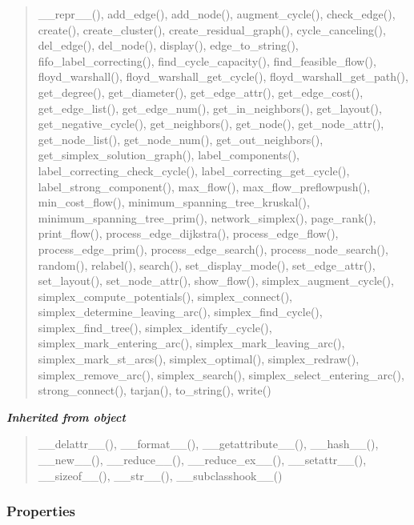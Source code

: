 \begin{quote}
\_\_repr\_\_(), add\_edge(), add\_node(), augment\_cycle(), check\_edge(), create(), create\_cluster(), create\_residual\_graph(), cycle\_canceling(), del\_edge(), del\_node(), display(), edge\_to\_string(), fifo\_label\_correcting(), find\_cycle\_capacity(), find\_feasible\_flow(), floyd\_warshall(), floyd\_warshall\_get\_cycle(), floyd\_warshall\_get\_path(), get\_degree(), get\_diameter(), get\_edge\_attr(), get\_edge\_cost(), get\_edge\_list(), get\_edge\_num(), get\_in\_neighbors(), get\_layout(), get\_negative\_cycle(), get\_neighbors(), get\_node(), get\_node\_attr(), get\_node\_list(), get\_node\_num(), get\_out\_neighbors(), get\_simplex\_solution\_graph(), label\_components(), label\_correcting\_check\_cycle(), label\_correcting\_get\_cycle(), label\_strong\_component(), max\_flow(), max\_flow\_preflowpush(), min\_cost\_flow(), minimum\_spanning\_tree\_kruskal(), minimum\_spanning\_tree\_prim(), network\_simplex(), page\_rank(), print\_flow(), process\_edge\_dijkstra(), process\_edge\_flow(), process\_edge\_prim(), process\_edge\_search(), process\_node\_search(), random(), relabel(), search(), set\_display\_mode(), set\_edge\_attr(), set\_layout(), set\_node\_attr(), show\_flow(), simplex\_augment\_cycle(), simplex\_compute\_potentials(), simplex\_connect(), simplex\_determine\_leaving\_arc(), simplex\_find\_cycle(), simplex\_find\_tree(), simplex\_identify\_cycle(), simplex\_mark\_entering\_arc(), simplex\_mark\_leaving\_arc(), simplex\_mark\_st\_arcs(), simplex\_optimal(), simplex\_redraw(), simplex\_remove\_arc(), simplex\_search(), simplex\_select\_entering\_arc(), strong\_connect(), tarjan(), to\_string(), write()
\end{quote}

\large{\textbf{\textit{Inherited from object}}}

\begin{quote}
\_\_delattr\_\_(), \_\_format\_\_(), \_\_getattribute\_\_(), \_\_hash\_\_(), \_\_new\_\_(), \_\_reduce\_\_(), \_\_reduce\_ex\_\_(), \_\_setattr\_\_(), \_\_sizeof\_\_(), \_\_str\_\_(), \_\_subclasshook\_\_()
\end{quote}


  \subsubsection{Properties}

